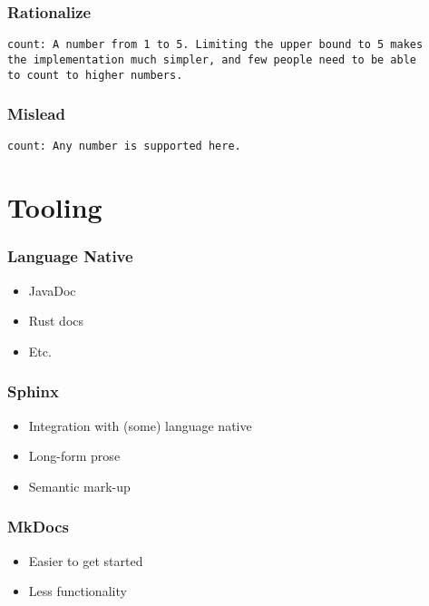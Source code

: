 \begin{frame}[fragile]
\frametitle{Rationalize}
\begin{lstlisting}
count: A number from 1 to 5. Limiting the upper bound to 5 makes
the implementation much simpler, and few people need to be able
to count to higher numbers.
\end{lstlisting}

\end{frame}

\begin{frame}[fragile]
\frametitle{Mislead}

\begin{lstlisting}
count: Any number is supported here.
\end{lstlisting}
\end{frame}

\section{Tooling}

\begin{frame}
\frametitle{Language Native}

\begin{itemize}
\item JavaDoc
\item Rust docs
\item Etc.
\end{itemize}

\end{frame}

\begin{frame}
\frametitle{Sphinx}

\begin{itemize}
\item Integration with (some) language native
\item Long-form prose
\item Semantic mark-up
\end{itemize}

\end{frame}

\begin{frame}
\frametitle{MkDocs}

\begin{itemize}
\item Easier to get started
\item Less functionality
\end{itemize}

\end{frame}

